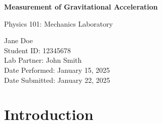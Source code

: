 \documentclass[11pt,a4paper]{article}
\newcommand{\SI}[2]{#1\,#2}
\newcommand{\experimenttitle}{Measurement of Gravitational Acceleration}
\newcommand{\coursename}{Physics 101: Mechanics Laboratory}
\newcommand{\studentname}{Jane Doe}
\newcommand{\studentid}{Student ID: 12345678}
\newcommand{\labpartner}{Lab Partner: John Smith}
\newcommand{\dateperformed}{Date Performed: January 15, 2025}
\newcommand{\datesubmitted}{Date Submitted: January 22, 2025}
\begin{document}
\begin{titlepage}
    \centering
    \vspace*{2cm}

    {\LARGE\bfseries \experimenttitle\par}
    \vspace{1.5cm}

    {\Large \coursename\par}
    \vspace{2cm}

    {\large
    \studentname\\
    \studentid\\
    \vspace{0.5cm}
    \labpartner\\
    \vspace{1cm}
    \dateperformed\\
    \datesubmitted\\
    }

    \vfill


\end{titlepage}

\begin{abstract}
\noindent
This experiment measured the acceleration due to gravity using a simple pendulum. Five different pendulum lengths ranging from $\SI{0.50}{m}$ to $\SI{1.50}{m}$ were tested, with period measurements taken for 10 oscillations each. The experimental value obtained was $g = \SI{9.81 +- 0.15}{m/s^2}$, which agrees with the accepted value of $\SI{9.81}{m/s^2}$ within experimental uncertainty. The primary sources of error were timing precision and small-angle approximation deviations.
\end{abstract}

\newpage


\section{Introduction}
\label{sec:intro}

\end{document}
